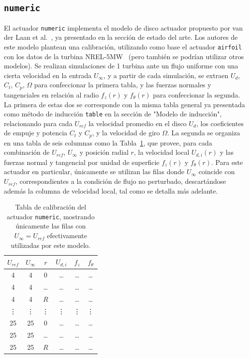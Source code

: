 \subsection{\texttt{numeric}}
El actuador \texttt{numeric} implementa el modelo de disco actuador propuesto por van der Laan et al.~\citep{vanderlaan2015}, ya presentado en la sección de estado del arte. Los autores de este modelo plantean una calibración, utilizando como base el actuador \texttt{airfoil} con los datos de la turbina NREL-5MW~\citep{jonkman2009} (pero también se podrían utilizar otros modelos). Se realizan simulaciones de 1 turbina ante un flujo uniforme con una cierta velocidad en la entrada $U_\infty$, y a partir de cada simulación, se extraen $U_d$, $C_t$, $C_p$, $\Omega$ para confeccionar la primera tabla, y las fuerzas normales y tangenciales en relación al radio $f_z(r)$ y $f_\theta(r)$ para confeccionar la segunda. La primera de estas dos se corresponde con la misma tabla general ya presentada como método de inducción \texttt{table} en la sección de "Modelo de inducción", relacionando para cada $U_{ref}$ la velocidad promedio en el disco $U_d$, los coeficientes de empuje y potencia $C_t$ y $C_p$, y la velocidad de giro $\Omega$. La segunda se organiza en una tabla de seis columnas como la Tabla~\ref{tab:vanderlaan_tabla2}, que provee, para cada combinación de $U_{ref}$, $U_\infty$ y posición radial $r$, la velocidad local $U_{d,i}(r)$ y las fuerzas normal y tangencial por unidad de superficie $f_z(r)$ y $f_\theta(r)$. Para este actuador en particular, únicamente se utilizan las filas donde $U_\infty$ coincide con $U_{ref}$, correspondientes a la condición de flujo no perturbado, descartándose además la columna de velocidad local, tal como se detalla más adelante.

\begin{table}[h]
\centering
\begin{tabular}{cccccc}
\hline
$U_{ref}$ & $U_\infty$ & $r$ & $U_{d,i}$ & $f_z$ & $f_\theta$ \\
\hline
4 & 4 & 0 & \ldots & \ldots & \ldots \\
4 & 4 & \ldots & \ldots & \ldots & \ldots \\
4 & 4 & $R$ & \ldots & \ldots & \ldots \\
\vdots & \vdots & \vdots & \vdots & \vdots & \vdots \\
25 & 25 & 0 & \ldots & \ldots & \ldots \\
25 & 25 & \ldots & \ldots & \ldots & \ldots \\
25 & 25 & $R$ & \ldots & \ldots & \ldots \\
\hline
\end{tabular}
\caption{Tabla de calibración del actuador \texttt{numeric}, mostrando únicamente las filas con $U_\infty=U_{ref}$ efectivamente utilizadas por este modelo.}
\label{tab:vanderlaan_tabla2}
\end{table}

